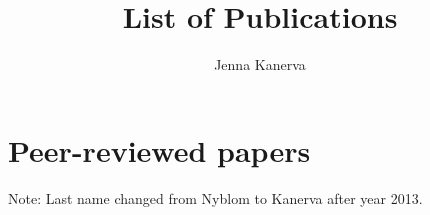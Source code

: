 \documentclass[letterpaper,11pt]{article}
\begin{document}
\title{\vspace{-1.5cm}List of Publications}
\author{Jenna Kanerva}
\date{}
\maketitle

\section{Peer-reviewed papers}
\renewcommand\refname{\vskip -1cm}
Note: Last name changed from Nyblom to Kanerva after year 2013.
\nocite{*}


\end{document}
